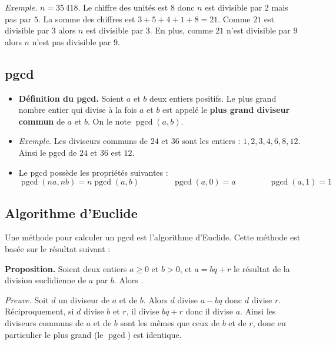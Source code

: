 \documentclass[11pt,class=report,crop=false]{standalone}
\newcommand{\pgcd}{\mathop{\mathrm{pgcd}}\nolimits}
\begin{document}
\emph{Exemple.} $n = 35\,418$. Le chiffre des unités est $8$ donc $n$ est divisible par $2$ mais pas par $5$. La somme des chiffres est $3+5+4+1+8 = 21$. Comme $21$ est divisible par $3$ alors $n$ est divisible par $3$.
En plus, comme $21$ n'est divisible par $9$ alors $n$ n'est pas divisible par $9$.
    
\subsection*{pgcd}

\begin{itemize}
    \item \textbf{Définition du pgcd.}
    Soient $a$ et $b$ deux entiers positifs. Le plus grand nombre entier  qui divise à la fois $a$ et $b$ est appelé le \textbf{plus grand diviseur commun} de $a$ et $b$. On le note $\pgcd(a,b)$.
    
    \item \emph{Exemple.} Les diviseurs communs de $24$ et $36$ sont les entiers : $1,2,3,4,6,8,12$.
    Ainsi le pgcd de $24$ et $36$ est $12$.
    
    
    \item Le pgcd possède les propriétés suivantes : $$\pgcd(na, nb) = n \pgcd(a,b) \qquad \qquad \pgcd(a,0) = a \qquad \qquad \pgcd(a,1)=1 $$
\end{itemize}

\subsection*{Algorithme d'Euclide}

Une méthode pour calculer un pgcd est l'algorithme d'Euclide.
Cette méthode est basée sur le résultat suivant :

\textbf{Proposition.}
Soient deux entiers $a\ge0$ et $b>0$, et $a=bq+r$ le résultat de la division euclidienne de $a$ par $b$. Alors \myboxinline{$\pgcd(a,b) = \pgcd(b,r)$}.

\emph{Preuve.}
Soit $d$ un diviseur de $a$ et de $b$. Alors $d$ divise $a-bq$ donc $d$ divise $r$. Réciproquement, si $d$ divise $b$ et $r$, il divise $bq+r$ donc il divise $a$. 
Ainsi les diviseurs communs de $a$ et de $b$ sont les mêmes que ceux de $b$ et de $r$, donc en particulier le plus grand (le $\pgcd$) est identique.


\bigskip
\end{document}

